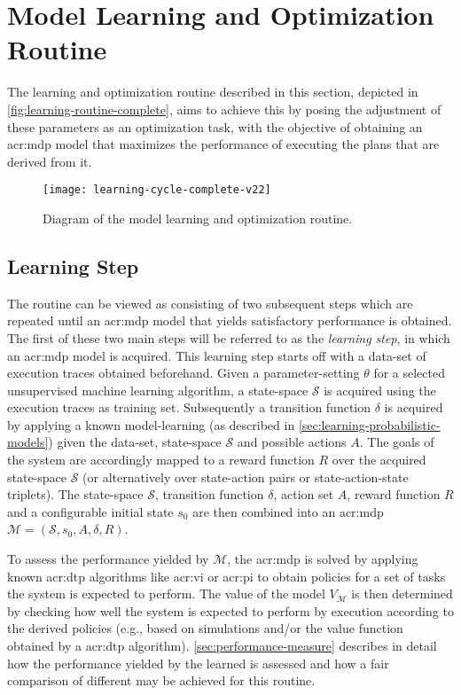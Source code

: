 \newpage

\section{Model Learning and Optimization Routine}
\label{sec:model-learning-routine}

The learning and optimization routine described in this section, depicted in \autoref{fig:learning-routine-complete}, aims to achieve this by posing the adjustment of these parameters as an optimization task, with the objective of obtaining an \acrshort{acr:mdp} model that maximizes the performance of executing the plans that are derived from it.

\begin{figure}[t]
	\centering
	\texttt{[image: learning-cycle-complete-v22]}
	\caption{Diagram of the model learning and optimization routine.}
	\label{fig:learning-routine-complete}
\end{figure}

\subsection{Learning Step}
\label{sec:learning-step}

The routine can be viewed as consisting of two subsequent steps which are repeated until an \acrshort{acr:mdp} model that yields satisfactory performance is obtained.
The first of these two main steps will be referred to as the \textit{learning step}, in which an \acrshort{acr:mdp} model is acquired.
This learning step starts off with a data-set of execution traces obtained beforehand.
Given a parameter-setting $\theta$ for a selected unsupervised machine learning algorithm, a state-space $\mathcal{S}$ is acquired using the execution traces as training set.
Subsequently a transition function $\delta$ is acquired by applying a known model-learning (as described in \autoref{sec:learning-probabilistic-models}) given the data-set, state-space $\mathcal{S}$ and possible actions $A$.
The goals of the system are accordingly mapped to a reward function $R$ over the acquired state-space $\mathcal{S}$ (or alternatively over state-action pairs or state-action-state triplets).
The state-space $\mathcal{S}$, transition function $\delta$, action set $A$, reward function $R$ and a configurable initial state $s_0$ are then combined into an \acrshort{acr:mdp} $\mathcal{M} = (\mathcal{S}, s_0, A, \delta, R)$.

To assess the performance yielded by $\mathcal{M}$, the \acrshort{acr:mdp} is solved by applying known \acrshort{acr:dtp} algorithms like \acrshort{acr:vi} or \acrshort{acr:pi} to obtain policies for a set of tasks the system is expected to perform.
The value of the model $V_{\mathcal{M}}$ is then determined by checking how well the system is expected to perform by execution according to the derived policies (e.g., based on simulations and/or the value function obtained by a \acrshort{acr:dtp} algorithm).
\autoref{sec:performance-measure} describes in detail how the performance yielded by the learned  is assessed and how a fair comparison of different  may be achieved for this routine.

